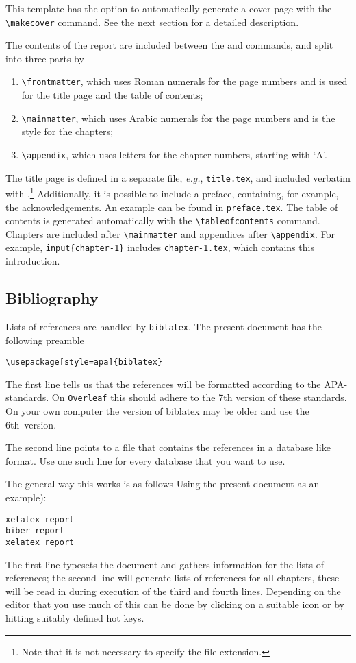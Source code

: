 This template has the option to automatically generate a cover page with the \verb|\makecover| command. See the next section for a detailed description.

The contents of the report are included between the \verb|| and \verb|| commands, and split into three parts by
\begin{enumerate}
    \item\verb|\frontmatter|, which uses Roman numerals for the page numbers and is used for the title page and the table of contents;
    \item\verb|\mainmatter|, which uses Arabic numerals for the page numbers and is the style for the chapters;
    \item\verb|\appendix|, which uses letters for the chapter numbers, starting with `A'.
\end{enumerate}
The title page is defined in a separate file, \emph{e.g.}, \texttt{title.tex}, and included verbatim with \verb||.\footnote{Note that it is not necessary to specify the file extension.} Additionally, it is possible to include a preface, containing, for example, the acknowledgements. An example can be found in \texttt{preface.tex}. The table of contents is generated automatically with the \verb|\tableofcontents| command. Chapters are included after \verb|\mainmatter| and appendices after \verb|\appendix|. For example, \verb|input{chapter-1}| includes \texttt{chapter-1.tex}, which contains this introduction.

\subsection{Bibliography}

Lists of references are handled by \texttt{biblatex}.
The present document has the following preamble
\begin{verbatim}
\usepackage[style=apa]{biblatex}

\end{verbatim}
The first line tells us that the references will be formatted according
to the APA-standards.
On \texttt{Overleaf} this should adhere to the 7th version of these
standards.
On your own computer the version of biblatex may be older and
use the 6th~version.

The second line points to a file that contains the references in a database
like format.
Use one such line for every database that you want to use.

The general way this works is as follows Using the present document as
an example):
\begin{verbatim}
xelatex report
biber report
xelatex report
\end{verbatim}
The first line typesets the document and gathers information for the lists
of references; the second line will generate lists of references for all
chapters, these will be read in during execution of the third and fourth lines.
Depending on the editor that you use much of this can be done by clicking
on a suitable icon or by hitting suitably defined hot keys.

